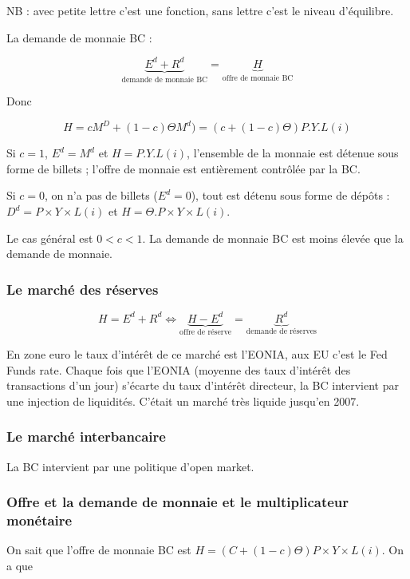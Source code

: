 	NB : avec petite lettre c'est une fonction, sans lettre c'est le niveau d'équilibre.
	
	La demande de monnaie BC :
	
	$$\underbrace{E^d + R^d}_{\text{demande de monnaie BC}} = \underbrace{H}_{\text{offre de monnaie BC}}$$
	
	Donc
	
	$$H = c M^D + (1 - c) \Theta M^d) = (c + (1 - c) \Theta) P . Y . L(i)$$
	
	Si $c = 1$, $E^d = M^d$ et $H = P . Y . L(i)$, l'ensemble de la monnaie est détenue sous forme de billets ; l'offre de monnaie est entièrement contrôlée par la BC.
	
	Si $c = 0$, on n'a pas de billets ($E^d = 0$), tout est détenu sous forme de dépôts : $D^d = P\times Y\times L(i)$ et $H = \Theta . P \times  Y \times  L(i)$.
	
	Le cas général est $0 < c < 1$. La demande de monnaie BC est moins élevée que la demande de monnaie.
	
	\subsubsection{Le marché des réserves}
	
	$$H = E^d + R^d \Leftrightarrow \underbrace{H - E^d}_{\text{offre de réserve}} = \underbrace{R^d}_{\text{demande de réserves}}$$
	
	En zone euro le taux d'intérêt de ce marché est l'EONIA, aux EU c'est le Fed Funds rate. Chaque fois que l'EONIA (moyenne des taux d'intérêt des transactions d'un jour) s'écarte du taux d'intérêt directeur, la BC intervient par une injection de liquidités. C'était un marché très liquide jusqu'en 2007.
	
	
	\subsubsection{Le marché interbancaire}
	
	La BC intervient par une politique d'open market.
	
	
	\subsubsection{Offre et la demande de monnaie et le multiplicateur monétaire}
	
	On sait que l'offre de monnaie BC est $H = (C + ( 1 - c) \Theta) P \times Y \times  L(i)$. On a que 
	
